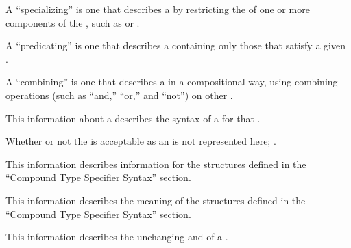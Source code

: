A ``specializing''  is one that describes a 
by restricting the  of one or more components of the ,
such as  or .

A ``predicating''  is one that describes a 
containing only those  that satisfy a given .

A ``combining''  is one that describes a 
in a compositional way, using combining operations (such as ``and,'' ``or,'' and
``not'') on other .

\endsubsubsubsection%


This information about a  describes the syntax of a 
 for that .

Whether or not the  is acceptable as an 
is not represented here; \seesection\TypeSpecEntries.

\endsubsubsubsection%


This information describes  information for the structures defined in
the ``Compound Type Specifier Syntax'' section.

\endsubsubsubsection%


This information describes the meaning of the structures defined in
the ``Compound Type Specifier Syntax'' section.

\endsubsubsubsection%

\endsubsubsection%


This information describes the unchanging  and  of 
a .

